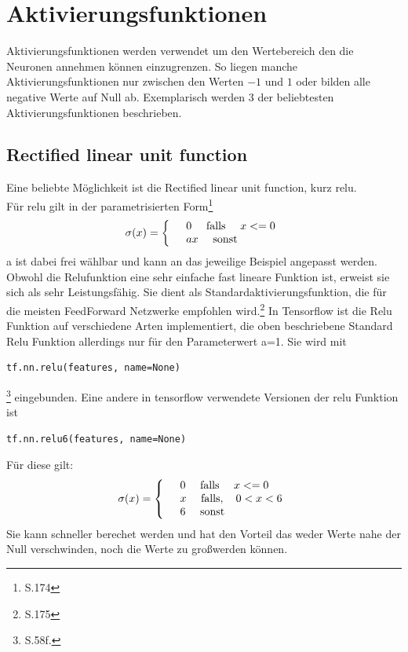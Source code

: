 \section{Aktivierungsfunktionen}
Aktivierungsfunktionen werden verwendet um den Wertebereich den die Neuronen annehmen k\"onnen einzugrenzen. So liegen manche Aktivierungsfunktionen nur zwischen den Werten $-1$ und $1$ oder bilden alle negative Werte auf Null ab. Exemplarisch werden 3 der beliebtesten Aktivierungsfunktionen beschrieben.
\subsection{Rectified linear unit function}
Eine beliebte M\"oglichkeit ist die Rectified linear unit function, kurz relu.\\
F\"ur relu gilt in der parametrisierten Form\footnote{\cite{Goodfellow}S.174 }
\begin{align*}
\sigma(x)=
\left\{
\begin{array}{l l}
& 0 \quad \text{   falls  } \quad x <= 0  \\ 
& ax \quad \text{   sonst}
\end{array}
\right.
\end{align*}
a ist dabei frei w\"ahlbar und kann an das jeweilige Beispiel angepasst werden. Obwohl die Relufunktion eine sehr einfache fast lineare Funktion ist, erweist sie sich als sehr Leistungsf\"ahig. Sie dient als Standardaktivierungsfunktion, die f\"ur die meisten FeedForward Netzwerke empfohlen wird.\footnote{\cite{Goodfellow}S.175 } In Tensorflow ist die Relu Funktion auf verschiedene Arten implementiert, die oben beschriebene Standard Relu Funktion allerdings nur f\"ur den Parameterwert a=1. Sie wird mit
\begin{lstlisting}
tf.nn.relu(features, name=None)
\end{lstlisting}\footnote{\cite{cookbook}S.58f.} 
eingebunden.
Eine andere in tensorflow verwendete Versionen der relu Funktion ist
\begin{lstlisting}
tf.nn.relu6(features, name=None)
\end{lstlisting}\cite{cookbook}
F\"ur diese gilt:
\begin{align*}
	\sigma(x)=
	\left\{
	\begin{array}{l l}
		& 0 \quad \text{   falls  } \quad x <= 0  \\ 
		& x \quad \text{   falls},\quad 0 < x < 6 \\
		& 6 \quad \text{   sonst}
	\end{array}
	\right.
\end{align*}
Sie kann schneller berechet werden und hat den Vorteil das weder Werte nahe der Null verschwinden, noch die Werte zu gro\ss werden k\"onnen.\cite{cookbook} 
